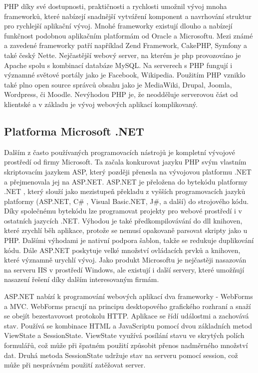 \documentclass[11pt,twoside,a4paper]{book}
\begin{document}
PHP díky své dostupnosti, praktičnosti a rychlosti umožnil vývoj mnoha frameworků, které nabízejí snadnější vytváření komponent a navrhování struktur pro rychlejší aplikační vývoj. Mnohé frameworky existují dlouho a nabízejí funkčnost podobnou aplikačním platformám od Oracle a Microsoftu. Mezi známé a zavedené frameworky patří například Zend Framework, CakePHP, Symfony a také český Nette. Nejčastější webový server, na kterém je php provozováno je Apache spolu s kombinací databáze MySQL. Na serverech s PHP fungují i významné světové portály jako je Facebook, Wikipedia. Použitím PHP vzniklo také plno open source správců obsahu jako je MediaWiki, Drupal, Joomla, Wordpress, či Moodle. Nevýhodou PHP je, že neodděluje serverovou část od klientské a v základu je vývoj webových aplikací komplikovaný. \cite{wiki:frameworks}
 

\subsection{Platforma Microsoft .NET}
\label{asp.net}
Dalším z často používaných programovacích nástrojů je kompletní vývojové prostředí od firmy Microsoft. Ta začala konkurovat jazyku PHP svým vlastním skriptovacím jazykem ASP, který později přenesla na vývojovou platformu .NET a přejmenovala jej na ASP.NET. ASP.NET  je přeložena do bytekódu platformy .NET , který slouží jako mezistupeň překladu z vyšších programovacích jazyků platformy (ASP.NET, C\# , Visual Basic.NET, J\#, a další) do strojového kódu\cite{netframework}.  Díky společnému bytekódu lze programovat projekty pro webové prostředí i v ostatních jazycích .NET. Výhodou je také předkompilovávání do dll knihoven, které zrychlí běh aplikace, protože se nemusí opakovaně parsovat skripty jako u PHP. Dalšími výhodami je nativní podpora šablon, takže se redukuje duplikování kódu. Dále ASP.NET poskytuje velké množství ovládacích prvků a knihoven, které významně urychlí vývoj. Jako produkt Microsoftu je nejčastěji nasazován na serveru IIS v prostředí Windows, ale existují i další servery, které umožňují nasazení řešení díky dalším interesovaným firmám.\cite{aspnet}

ASP.NET nabízí k programování webových aplikací dva frameworky - WebForms a MVC. 
WebForms pracují na principu desktopového grafického rozhraní a snaží se obejít bezestavovost protokolu HTTP. Aplikace se řídí událostmi a  zachovává stav. Používá se kombinace HTML a JavaScriptu pomocí dvou základních metod ViewState a SessionState. ViewState využívá posílání stavu ve skrytých polích formulářů, což může při špatném použití způsobit přenos nadměrného množství dat. Druhá metoda SessionState udržuje stav na serveru pomocí session, což může při nesprávném použití zatěžovat server.
\end{document}

